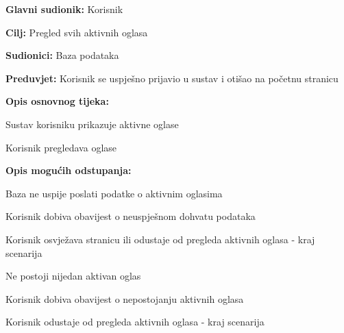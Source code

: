 					\noindent {}
					\begin{packed_item}
	
						\item \textbf{Glavni sudionik: }Korisnik
						\item  \textbf{Cilj:} Pregled svih aktivnih oglasa
						\item  \textbf{Sudionici:} Baza podataka
						\item  \textbf{Preduvjet:} Korisnik se uspješno prijavio u sustav i otišao na početnu stranicu
						\item  \textbf{Opis osnovnog tijeka:}
						
						\item[] \begin{packed_enum}
							\item Sustav korisniku prikazuje aktivne oglase
							\item Korisnik pregledava oglase
						\end{packed_enum}
						\item  \textbf{Opis mogućih odstupanja:}

						\item[] \begin{packed_item}
							\item[1.a] Baza ne uspije poslati podatke o aktivnim oglasima
							\item[] \begin{packed_enum}
								
								\item Korisnik dobiva obavijest o neuspješnom dohvatu podataka
								\item Korisnik osvježava stranicu ili odustaje od pregleda aktivnih oglasa - kraj scenarija
							
							\end{packed_enum}	
							\item[1.b] Ne postoji nijedan aktivan oglas
							\item[] \begin{packed_enum}
								
								\item Korisnik dobiva obavijest o nepostojanju aktivnih oglasa
								\item Korisnik odustaje od pregleda aktivnih oglasa - kraj scenarija
							
							\end{packed_enum}
						\end{packed_item}	
					\end{packed_item}

